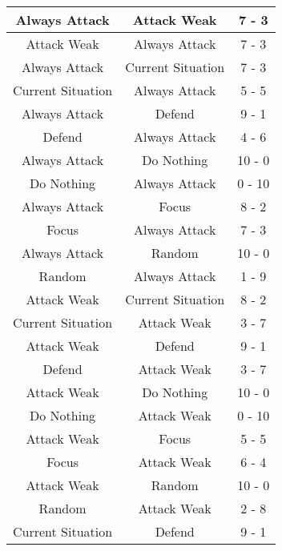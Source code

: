 \documentclass[11pt]{article}
\begin{document}
\begin{longtable}{|c|c|c|}
                \hline   Always Attack   &    Attack Weak    &   7 - 3   \\
                \hline    Attack Weak    &   Always Attack   &   7 - 3   \\
                \hline   Always Attack   & Current Situation &   7 - 3   \\
                \hline Current Situation &   Always Attack   &   5 - 5   \\
                \hline   Always Attack   &      Defend       &   9 - 1   \\
                \hline      Defend       &   Always Attack   &   4 - 6   \\
                \hline   Always Attack   &    Do Nothing     &  10 - 0   \\
                \hline    Do Nothing     &   Always Attack   &  0 - 10   \\
                \hline   Always Attack   &       Focus       &   8 - 2   \\
                \hline       Focus       &   Always Attack   &   7 - 3   \\
                \hline   Always Attack   &      Random       &  10 - 0   \\
                \hline      Random       &   Always Attack   &   1 - 9   \\
                \hline    Attack Weak    & Current Situation &   8 - 2   \\
                \hline Current Situation &    Attack Weak    &   3 - 7   \\
                \hline    Attack Weak    &      Defend       &   9 - 1   \\
                \hline      Defend       &    Attack Weak    &   3 - 7   \\
                \hline    Attack Weak    &    Do Nothing     &  10 - 0   \\
                \hline    Do Nothing     &    Attack Weak    &  0 - 10   \\
                \hline    Attack Weak    &       Focus       &   5 - 5   \\
                \hline       Focus       &    Attack Weak    &   6 - 4   \\
                \hline    Attack Weak    &      Random       &  10 - 0   \\
                \hline      Random       &    Attack Weak    &   2 - 8   \\
                \hline Current Situation &      Defend       &   9 - 1   \\

\end{longtable}
\end{document}
